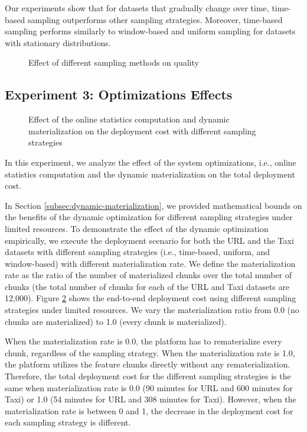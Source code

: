 Our experiments show that for datasets that gradually change over time, time-based sampling outperforms other sampling strategies.
Moreover, time-based sampling performs similarly to window-based and uniform sampling for datasets with stationary distributions.

\begin{figure}[!h]
\centering
\resizebox{\columnwidth}{!}{}
\caption{Effect of different sampling methods on quality}
\label{sampling-method-figure}
\end{figure}

\subsection{Experiment 3: Optimizations Effects}
\begin{figure}[!h]
\centering
\resizebox{\columnwidth}{!}{}
\caption{Effect of the online statistics computation and dynamic materialization on the deployment cost with different sampling strategies}
\label{fig-optimization-effect}
\end{figure}
In this experiment, we analyze the effect of the system optimizations, i.e., online statistics computation and the dynamic materialization on the total deployment cost.

In Section \ref{subsec:dynamic-materialization}, we provided mathematical bounds on the benefits of the dynamic optimization for different sampling strategies under limited resources.
To demonstrate the effect of the dynamic optimization empirically, we execute the deployment scenario for both the URL and the Taxi datasets with different sampling strategies (i.e., time-based, uniform, and window-based) with different materialization rate.
We define the materialization rate as the ratio of the number of materialized chunks over the total number of chunks (the total number of chunks for each of the URL and Taxi datasets are 12,000).
Figure \ref{fig-optimization-effect} shows the end-to-end deployment cost using different sampling strategies under limited resources.
We vary the materialization ratio from 0.0 (no chunks are materialized) to 1.0 (every chunk is materialized).

When the materialization rate is 0.0, the platform has to rematerialize every chunk, regardless of the sampling strategy.
When the materialization rate is 1.0, the platform utilizes the feature chunks directly without any rematerialization.
Therefore, the total deployment cost for the different sampling strategies is the same when materialization rate is 0.0 (90 minutes for URL and 600 minutes for Taxi) or 1.0 (54 minutes for URL and 308 minutes for Taxi).
However, when the materialization rate is between 0 and 1, the decrease in the deployment cost for each sampling strategy is different.

